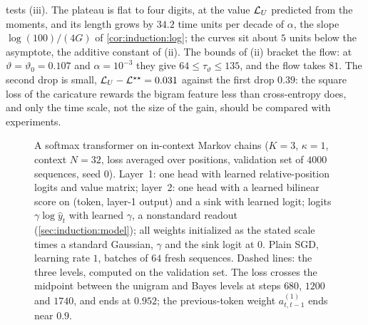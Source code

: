 \begin{refsection}
 tests (iii). The plateau is flat to four digits, at the value $\mathcal{L}_{U}$ predicted from the moments, and its length grows by $34.2$ time units per decade of $\alpha$, the slope $\log(100)/(4G)$ of \cref{cor:induction:log}; the curves sit about $5$ units below the asymptote, the additive constant of (ii). The bounds of (ii) bracket the flow: at $\vartheta=\vartheta_0=0.107$ and $\alpha=10^{-3}$ they give $64\le\tau_\vartheta\le135$, and the flow takes $81$. The second drop is small, $\mathcal{L}_{U}-\mathcal{L}^{\star\star}=0.031$ against the first drop $0.39$: the square loss of the caricature rewards the bigram feature less than cross-entropy does, and only the time scale, not the size of the gain, should be compared with experiments.

\begin{figure}[t]
\centering
{}
\caption{A softmax transformer on in-context Markov chains ($K=3$, $\kappa=1$, context $N=32$, loss averaged over positions, validation set of $4000$ sequences, seed $0$). Layer~1: one head with learned relative-position logits and value matrix; layer~2: one head with a learned bilinear score on (token, layer-1 output) and a sink with learned logit; logits $\gamma\log\hat y_t$ with learned $\gamma$, a nonstandard readout (\cref{sec:induction:model}); all weights initialized as the stated scale times a standard Gaussian, $\gamma$ and the sink logit at $0$. Plain SGD, learning rate $1$, batches of $64$ fresh sequences. Dashed lines: the three levels, computed on the validation set. The loss crosses the midpoint between the unigram and Bayes levels at steps $680$, $1200$ and $1740$, and ends at $0.952$; the previous-token weight $a^{(1)}_{t,t-1}$ ends near $0.9$.}\label{fig:induction:transformer}
\end{figure}


\end{refsection}
